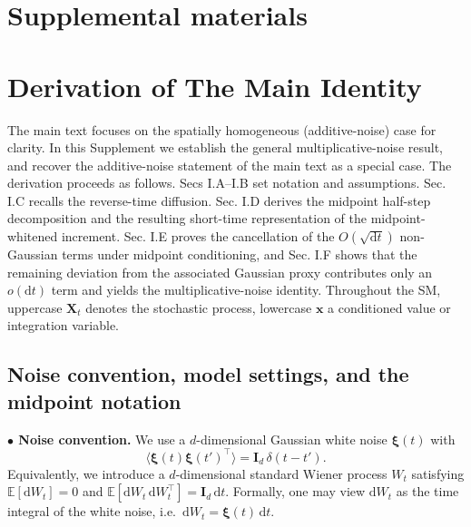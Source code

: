 \setcounter{secnumdepth}{3}





\setcounter{equation}{0}
\setcounter{figure}{0}
\setcounter{table}{0}
\setcounter{page}{1}

\renewcommand{\theequation}{S\arabic{equation}}
\renewcommand{\theHequation}{S\arabic{equation}}
\renewcommand{\thefigure}{S\arabic{figure}}
\renewcommand{\theHfigure}{S\arabic{figure}}

\section*{Supplemental materials}

\section{Derivation of The Main Identity}
\vspace*{-0.3\baselineskip}
The main text focuses on the spatially homogeneous (additive-noise) case for clarity. In this Supplement we establish the general multiplicative-noise result, and recover the additive-noise statement of the main text as a special case.
The derivation proceeds as follows. Secs I.A--I.B set notation and assumptions. Sec. I.C recalls the reverse-time diffusion. Sec. I.D derives the midpoint half-step decomposition and the resulting short-time representation of the midpoint-whitened increment. Sec. I.E proves the cancellation of the $O(\sqrt{\mathrm dt})$ non-Gaussian terms under midpoint conditioning, and Sec. I.F shows that the remaining deviation from the associated Gaussian proxy contributes only an $o(\mathrm dt)$ term and yields the multiplicative-noise identity. Throughout the SM, uppercase $\bm X_t$ denotes the stochastic process, lowercase $\bm x$ a conditioned value or integration variable.

\vspace*{-0.5\baselineskip}
\subsection{Noise convention, model settings, and the midpoint notation}
\vspace*{-0.5\baselineskip}
\noindent\textbf{$\bullet$ Noise convention.} We use a $d$-dimensional Gaussian white noise $\bm{\xi}(t)$ with
\begin{equation}
    \langle\bm{\xi}(t)\bm{\xi}(t')^\intercal\rangle=\mathbf{I}_d\,\delta(t-t').
    \label{seq:noise_def}
\end{equation}
Equivalently, we introduce a $d$-dimensional standard Wiener process $W_t$ satisfying
$\mathbb{E}[\mathrm{d}W_t]=0$ and
$\mathbb{E}[\mathrm{d}W_t\,\mathrm{d}W_t^\intercal]=\mathbf{I}_d\,\mathrm{d}t$.
Formally, one may view $\mathrm{d}W_t$ as the time integral of the white noise,
i.e.\ $\mathrm{d}W_t = \bm{\xi}(t)\,\mathrm{d}t$.

